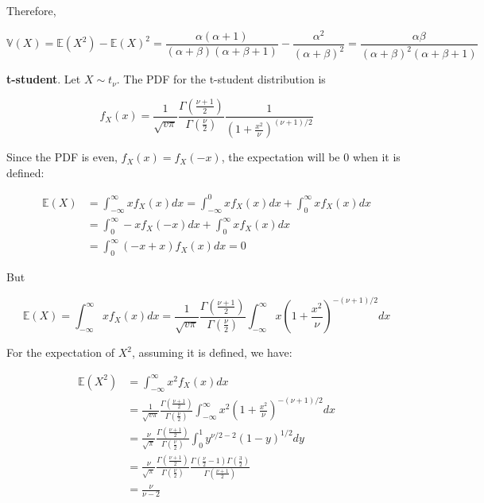 Therefore,

\[ \mathbb{V}(X) = \mathbb{E}(X^{2}) - \mathbb{E}(X)^{2} = \frac{\alpha (\alpha + 1)}{(\alpha + \beta)(\alpha + \beta + 1)} - \frac{\alpha^{2}}{(\alpha + \beta)^{2}} = \frac{\alpha \beta}{(\alpha + \beta)^{2} (\alpha + \beta + 1)} \]

\textbf{t-student}. Let \(X \sim t_\nu\). The PDF for the t-student
distribution is

\[ f_X(x) = \frac{1}{\sqrt{v \pi}} \frac{\Gamma\left(\frac{\nu + 1}{2}\right)}{\Gamma\left(\frac{\nu}{2}\right)} \frac{1}{\left(1 + \frac{x^{2}}{\nu} \right)^{(\nu + 1)/2}} \]

Since the PDF is even, \(f_X(x) = f_X(-x)\), the expectation will be 0
when it is defined:

\begin{align*}
\mathbb{E}(X) 
& = \int_{-\infty}^{\infty} x f_X(x) dx 
  = \int_{-\infty}^{0} x f_X(x) dx + \int_{0}^{\infty} x f_X(x) dx 
\\
& = \int_{0}^{\infty} -x f_X(-x) dx + \int_{0}^{\infty} x f_X(x) dx 
\\
& = \int_{0}^{\infty} (-x + x)f_X(x) dx = 0
\end{align*}

But

\[ \mathbb{E}(X) = \int_{-\infty}^{\infty} x f_X(x) dx = \frac{1}{\sqrt{v \pi}} \frac{\Gamma\left(\frac{\nu + 1}{2}\right)}{\Gamma\left(\frac{\nu}{2}\right)} \int_{-\infty}^{\infty} x  \left(1 + \frac{x^{2}}{\nu} \right)^{-(\nu + 1)/2} dx \]

For the expectation of \(X^{2}\), assuming it is defined, we have:

\begin{align*}
\mathbb{E}(X^{2}) &= \int_{-\infty}^{\infty} x^{2} f_X(x) dx \\
&= \frac{1}{\sqrt{v \pi}} \frac{\Gamma\left(\frac{\nu + 1}{2}\right)}{\Gamma\left(\frac{\nu}{2}\right)} \int_{-\infty}^{\infty} x^{2} \left( 1 + \frac{x^{2}}{\nu}\right)^{-(\nu + 1) / 2} dx \\
&= \frac{\nu}{\sqrt{\pi}} \frac{\Gamma\left(\frac{\nu + 1}{2}\right)}{\Gamma\left(\frac{\nu}{2}\right)} \int_{0}^{1} y^{\nu /2 - 2} \left( 1 - y \right)^{1 / 2} dy \\
&= \frac{\nu}{\sqrt{\pi}} \frac{\Gamma\left(\frac{\nu + 1}{2}\right)}{\Gamma\left(\frac{\nu}{2}\right)} \frac{\Gamma\left(\frac{\nu}{2} - 1\right) \Gamma\left(\frac{3}{2}\right)}{\Gamma\left(\frac{\nu + 1}{2}\right)} \\
&= \frac{\nu}{\nu - 2}
\end{align*}

